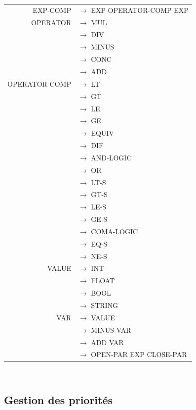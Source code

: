 \documentclass[a4paper,10pt]{article}
\begin{document}
\begin{tabular}{rl}
EXP-COMP			& $\rightarrow$ EXP OPERATOR-COMP EXP \\

OPERATOR			& $\rightarrow$ MUL \\ 
					& $\rightarrow$ DIV \\ 
					& $\rightarrow$ MINUS \\ 
					& $\rightarrow$ CONC \\ 
					& $\rightarrow$ ADD	\\ 
OPERATOR-COMP		& $\rightarrow$ LT\\
					& $\rightarrow$ GT	\\
					& $\rightarrow$ LE	\\
					& $\rightarrow$ GE	\\
					& $\rightarrow$ EQUIV	\\
					& $\rightarrow$ DIF	\\
					& $\rightarrow$ AND-LOGIC	\\
					& $\rightarrow$ OR		\\
					& $\rightarrow$ LT-S\\
					& $\rightarrow$ GT-S\\
					& $\rightarrow$ LE-S	\\
					& $\rightarrow$ GE-S	\\
					& $\rightarrow$ COMA-LOGIC	\\
					& $\rightarrow$ EQ-S	\\
					& $\rightarrow$ NE-S	\\

VALUE				& $\rightarrow$ INT \\
					& $\rightarrow$ FLOAT \\
					& $\rightarrow$ BOOL \\
					& $\rightarrow$ STRING \\
					
VAR					& $\rightarrow$ VALUE \\
					& $\rightarrow$ MINUS VAR\\
					& $\rightarrow$ ADD VAR \\
					& $\rightarrow$ OPEN-PAR EXP CLOSE-PAR \\

\end{tabular}

~\\

\subsection{Gestion des priorités}
\end{document}
